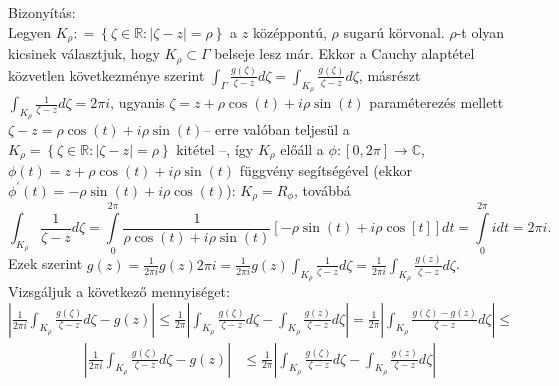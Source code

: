 \documentclass[12pt,a4paper]{scrartcl}
\newenvironment{bizonyitas}{}{}
\begin{document}
\begin{bizonyitas}

Bizonyítás:\\
Legyen
\(K_{\rho}: = \left\{ {\zeta \in {\mathbb{R}}:\left| {\zeta - z} \right| = \rho} \right\}\)
a \(z\) középpontú, \(\rho\) sugarú körvonal. \(\rho\)-t olyan kicsinek
választjuk, hogy \(K_{\rho} \subset \Gamma\) belseje lesz már. Ekkor a
Cauchy alaptétel közvetlen következménye szerint
\({\int_{\Gamma}{\frac{g\left( \zeta \right)}{\zeta - z}d\zeta}} = {\int_{K_{\rho}}{\frac{g\left( \zeta \right)}{\zeta - z}d\zeta}}\),
másrészt \({\int_{K_{\rho}}{\frac{1}{\zeta - z}d\zeta}} = 2\pi i\),
ugyanis
\(\zeta = z + \rho\cos\left( t \right) + i\rho\sin\left( t \right)\)
paraméterezés mellett
\(\zeta - z = \rho\cos\left( t \right) + i\rho\sin\left( t \right)\)--
erre valóban teljesül a
\(K_{\rho} = \left\{ {\zeta \in {\mathbb{R}}:\left| {\zeta - z} \right| = \rho} \right\}\)
kitétel --, így \(K_{\rho}\) előáll a
\(\left. \phi:\left\lbrack {0,2\pi} \right\rbrack\rightarrow{\mathbb{C}} \right.\),
\(\phi\left( t \right) = z + \rho\cos\left( t \right) + i\rho\sin\left( t \right)\)
függvény segítségével (ekkor
\(\phi^{\prime}\left( t \right) = - \rho\sin\left( t \right) + i\rho\cos\left( t \right)\)):
\(K_{\rho} = R_{\phi}\), továbbá
\[{\int_{K_{\rho}}{\frac{1}{\zeta - z}d\zeta}} = \int\limits_{0}^{2\pi}\frac{1}{\rho\cos\left( t \right) + i\rho\sin\left( t \right)}\left\lbrack {- \rho\sin\left( t \right) + i\rho\cos\left\lbrack t \right\rbrack} \right\rbrack dt = \int\limits_{0}^{2\pi}idt = 2\pi i.\]Ezek
szerint
\(g\left( z \right) = \frac{1}{2\pi i}g\left( z \right)2\pi i = \frac{1}{2\pi i}g\left( z \right){\int_{K_{\rho}}{\frac{1}{\zeta - z}d\zeta}} = \frac{1}{2\pi i}{\int_{K_{\rho}}{\frac{g\left( z \right)}{\zeta - z}d\zeta}}\).
Vizsgáljuk a következő mennyiséget:
\(\left| {\frac{1}{2\pi i}{\int_{K_{\rho}}{\frac{g\left( \zeta \right)}{\zeta - z}d\zeta}} - g\left( z \right)} \right| \leq \frac{1}{2\pi}\left| {{\int_{K_{\rho}}{\frac{g\left( \zeta \right)}{\zeta - z}d\zeta}} - {\int_{K_{\rho}}{\frac{g\left( z \right)}{\zeta - z}d\zeta}}} \right| = \frac{1}{2\pi}\left| {\int_{K_{\rho}}{\frac{g\left( \zeta \right) - g\left( z \right)}{\zeta - z}d\zeta}} \right| \leq\)
\[\begin{aligned}
  \left| {\frac{1}{{2\pi i}}\int_{{K_\rho }} {\frac{{g\left( \zeta  \right)}}{{\zeta  - z}}d\zeta }  - g\left( z \right)} \right| &  \leqslant \frac{1}{{2\pi }}\left| {\int_{{K_\rho }} {\frac{{g\left( \zeta  \right)}}{{\zeta  - z}}d\zeta }  - \int_{{K_\rho }} {\frac{{g\left( z \right)}}{{\zeta  - z}}d\zeta } } \right| \\ 

\end{aligned}\]
\end{bizonyitas}
\end{document}
